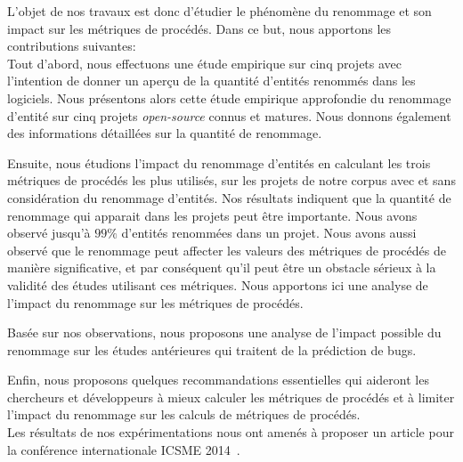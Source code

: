 L'objet de nos travaux est donc d’étudier le phénomène du renommage et son impact sur les métriques de procédés. Dans ce but, nous apportons les contributions suivantes:\\

Tout d'abord, nous effectuons une étude empirique sur cinq projets avec l'intention de donner un aperçu de la quantité d'entités renommés dans les logiciels. Nous présentons alors cette étude empirique approfondie du renommage d'entité sur cinq projets \textit{open-source} connus et matures. Nous donnons également des informations détaillées sur la quantité de renommage.

Ensuite, nous étudions l'impact du renommage d'entités en calculant les trois métriques de procédés les plus utilisés, sur les projets de notre corpus avec et sans considération du renommage d'entités. Nos résultats indiquent que la quantité de renommage qui apparait dans les projets peut être importante. Nous avons observé jusqu'à $99\%$ d'entités renommées dans un projet. Nous avons aussi observé que le renommage peut affecter les valeurs des métriques de procédés de manière significative, et par conséquent qu'il peut être un obstacle sérieux à la validité des études utilisant ces métriques. Nous apportons ici une analyse de l'impact du renommage sur les métriques de procédés.

Basée sur nos observations, nous proposons une analyse de l'impact possible du renommage sur les études antérieures qui traitent de la prédiction de bugs. 

Enfin, nous proposons quelques recommandations essentielles qui aideront les chercheurs et développeurs à mieux calculer les métriques de procédés et à limiter l'impact du renommage sur les calculs de métriques de procédés.\\

Les résultats de nos expérimentations nous ont amenés à proposer un article pour la conférence internationale ICSME 2014~\cite{icsme_2014}.




